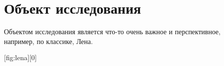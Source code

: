 \newpage
\section{Объект исследования}\label{section:Объект}

Объектом исследования является что-то очень важное и перспективное, например, по классике, Лена.

[fig:lena][0]
